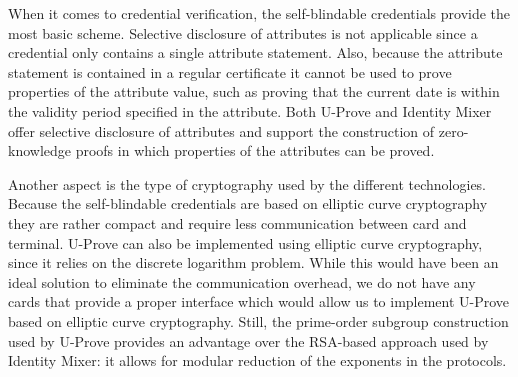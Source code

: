 When it comes to credential verification, the self-blindable credentials provide
the most basic scheme. Selective disclosure of attributes is not applicable
since a credential only contains a single attribute statement. Also, because the
attribute statement is contained in a regular certificate it cannot be used to
prove properties of the attribute value, such as proving that the current date
is within the validity period specified in the attribute. Both U-Prove and Identity Mixer offer
selective disclosure of attributes and support the construction of
zero-knowledge proofs in which properties of the attributes can be proved.

Another aspect is the type of cryptography used by the different technologies.
Because the self-blindable credentials are based on elliptic curve cryptography
they are rather compact and require less communication between card and
terminal. U-Prove can also be implemented using elliptic curve cryptography,
since it relies on the discrete logarithm problem. While this would have been
an ideal solution to eliminate the communication overhead, we do not have any
cards that provide a proper interface which would allow us to implement U-Prove
based on elliptic curve cryptography. Still, the prime-order subgroup
construction used by U-Prove provides an advantage over the RSA-based approach
used by Identity Mixer: it allows for modular reduction of the exponents in the
protocols.

